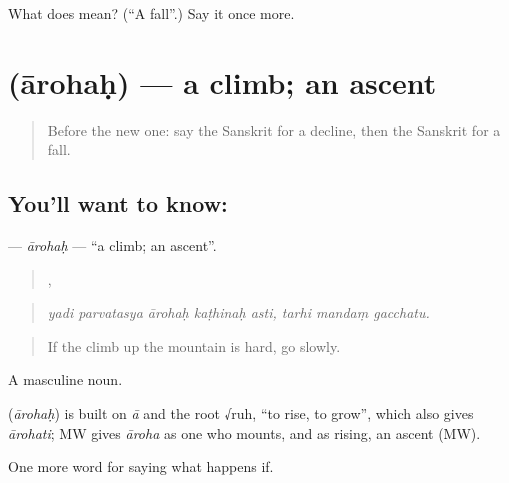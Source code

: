 \begin{tcolorbox}[breakable,colback=teal!4,colframe=teal!35!black,title={Before you move on}]
What does  mean? (\textquotedblleft{}A fall\textquotedblright{}.) Say it once more.
\end{tcolorbox}
\section[\texorpdfstring{\sk{आरोहः} (ārohaḥ)}{आरोहः (ārohaḥ)}]{ (ārohaḥ) — a climb; an ascent}

\label{lesson:SA-C547-arohah}



\begin{quote}
Before the new one: say the Sanskrit for a decline, then the Sanskrit for a fall.
\end{quote}

\subsection*{You'll want to know: }
\textbf{} — \emph{ārohaḥ} — \textquotedblleft{}a climb; an ascent\textquotedblright{}.

\begin{quote}
    ,   
\end{quote}

\begin{quote}
\emph{yadi parvatasya ārohaḥ kaṭhinaḥ asti, tarhi mandaṃ gacchatu.}
\end{quote}

\begin{quote}
If the climb up the mountain is hard, go slowly.
\end{quote}

A masculine noun.

\begin{cousinweb}
\textbf{} (\emph{ārohaḥ}) is built on \emph{ā} and the root √ruh, \textquotedblleft{}to rise, to grow\textquotedblright{}, which also gives \emph{ārohati}; MW gives \emph{āroha} as one who mounts, and as rising, an ascent (MW).
\end{cousinweb}

\begin{grammarlens}[title={What you've built}]
One more word for saying what happens if.
\end{grammarlens}

